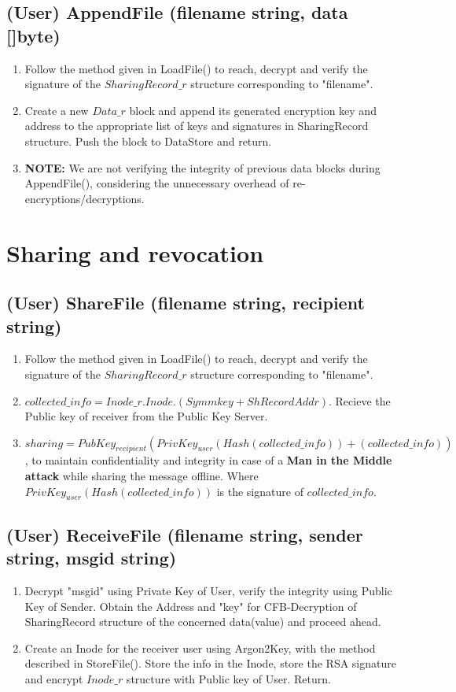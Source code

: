 \documentclass[a4paper, 12pt]{scrartcl}
\begin{document}
\subsection{(User) AppendFile (filename string, data []byte)}
\begin{enumerate}
	\itemsep0em
	\item Follow the method given in LoadFile() to reach, decrypt and verify the signature of the $SharingRecord\_r$ structure corresponding to "filename". 
	\item Create a new $Data\_r$ block and append its generated encryption key and address to the appropriate list of keys and signatures in SharingRecord structure. Push the block to DataStore and return.
	\item \textbf{NOTE:} We are not verifying the integrity of previous data blocks during AppendFile(), considering the unnecessary overhead of re-encryptions/decryptions.
\end{enumerate}

\section{Sharing and revocation}

\subsection{(User) ShareFile (filename string, recipient string)}
\begin{enumerate}
	\itemsep0em
	\item Follow the method given in LoadFile() to reach, decrypt and verify the signature of the $SharingRecord\_r$ structure corresponding to "filename".
	\item $collected\_info = Inode\_r.Inode.(Symmkey + ShRecordAddr)$. Recieve the Public key of receiver from the Public Key Server.
	\item $sharing = PubKey_{recipient}(PrivKey_{user}(Hash(collected\_info)) + (collected\_info))$, to maintain confidentiality and integrity in case of a \textbf{Man in the Middle attack} while sharing the message offline. Where $PrivKey_{user}(Hash(collected\_info))$ is the signature of $collected\_info$.
\end{enumerate}

\subsection{(User) ReceiveFile (filename string, sender string, msgid string)}
\begin{enumerate}
	\itemsep0em
	\item Decrypt "msgid" using Private Key of User, verify the integrity using Public Key of Sender. Obtain the Address and "key" for CFB-Decryption of SharingRecord structure of the concerned data(value) and proceed ahead.
	\item Create an Inode for the receiver user using Argon2Key, with the method described in StoreFile(). Store the info in the Inode, store the RSA signature and encrypt $Inode\_r$ structure with Public key of User. Return.
\end{enumerate}
\end{document}
